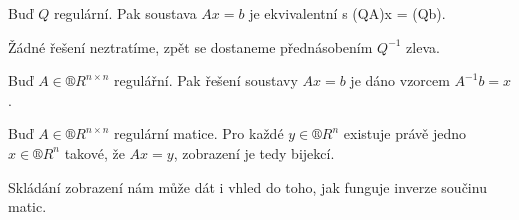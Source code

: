 \documentclass[12pt]{article}					%
\begin{document}
    \begin{poznamka}
        Buď $Q$ regulární. Pak soustava $Ax = b$ je ekvivalentní s (QA)x = (Qb).
        \begin{dukazin}
            Žádné řešení neztratíme, zpět se dostaneme přednásobením $Q^{-1}$ zleva.
        \end{dukazin}
    \end{poznamka}

    \begin{veta}
        Buď $A\in ®R^{n\times n}$ regulářní. Pak řešení soustavy $Ax = b$ je dáno vzorcem $A^{-1}b = x$.
    \end{veta}

    \begin{poznamka}
        Buď $A \in ®R^{n\times n}$ regulární matice. Pro každé $y \in ®R^n$ existuje právě jedno $x \in ®R^n$ takové, že $Ax = y$, zobrazení je tedy bijekcí.
    \end{poznamka}

    \begin{poznamka}
        Skládání zobrazení nám může dát i vhled do toho, jak funguje inverze součinu matic.
    \end{poznamka}
\end{document}
